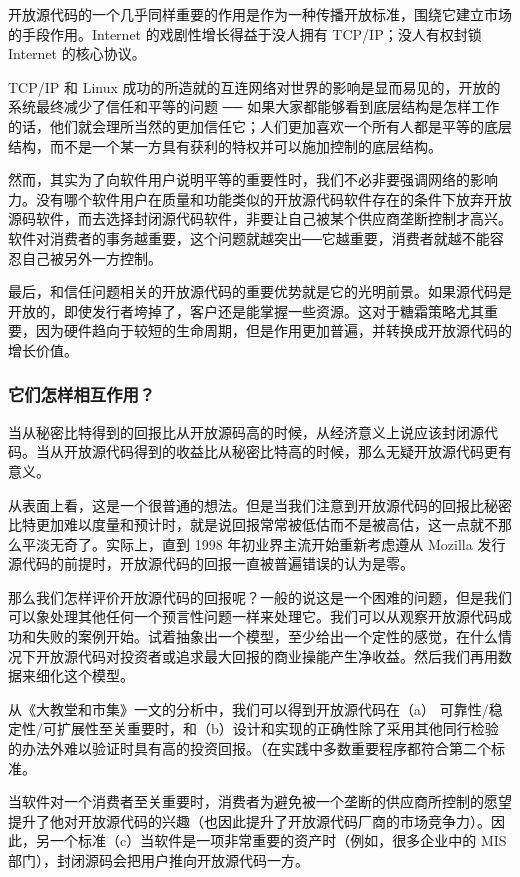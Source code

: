 开放源代码的一个几乎同样重要的作用是作为一种传播开放标准，围绕它建立市场的手段作用。Internet 的戏剧性增长得益于没人拥有 TCP/IP；没人有权封锁 Internet 的核心协议。


TCP/IP 和 Linux 成功的所造就的互连网络对世界的影响是显而易见的，开放的系统最终减少了信任和平等的问题 ── 如果大家都能够看到底层结构是怎样工作的话，他们就会理所当然的更加信任它；人们更加喜欢一个所有人都是平等的底层结构，而不是一个某一方具有获利的特权并可以施加控制的底层结构。


然而，其实为了向软件用户说明平等的重要性时，我们不必非要强调网络的影响力。没有哪个软件用户在质量和功能类似的开放源代码软件存在的条件下放弃开放源码软件，而去选择封闭源代码软件，非要让自己被某个供应商垄断控制才高兴。软件对消费者的事务越重要，这个问题就越突出──它越重要，消费者就越不能容忍自己被另外一方控制。


最后，和信任问题相关的开放源代码的重要优势就是它的光明前景。如果源代码是开放的，即使发行者垮掉了，客户还是能掌握一些资源。这对于糖霜策略尤其重要，因为硬件趋向于较短的生命周期，但是作用更加普遍，并转换成开放源代码的增长价值。

\subsubsection{它们怎样相互作用？}
当从秘密比特得到的回报比从开放源码高的时候，从经济意义上说应该封闭源代码。当从开放源代码得到的收益比从秘密比特高的时候，那么无疑开放源代码更有意义。


从表面上看，这是一个很普通的想法。但是当我们注意到开放源代码的回报比秘密比特更加难以度量和预计时，就是说回报常常被低估而不是被高估，这一点就不那么平淡无奇了。实际上，直到 1998 年初业界主流开始重新考虑遵从 Mozilla 发行源代码的前提时，开放源代码的回报一直被普遍错误的认为是零。


那么我们怎样评价开放源代码的回报呢？一般的说这是一个困难的问题，但是我们可以象处理其他任何一个预言性问题一样来处理它。我们可以从观察开放源代码成功和失败的案例开始。试着抽象出一个模型，至少给出一个定性的感觉，在什么情况下开放源代码对投资者或追求最大回报的商业操能产生净收益。然后我们再用数据来细化这个模型。


从《大教堂和市集》一文的分析中，我们可以得到开放源代码在（a） 可靠性/稳定性/可扩展性至关重要时，和（b）设计和实现的正确性除了采用其他同行检验的办法外难以验证时具有高的投资回报。（在实践中多数重要程序都符合第二个标准。


当软件对一个消费者至关重要时，消费者为避免被一个垄断的供应商所控制的愿望提升了他对开放源代码的兴趣（也因此提升了开放源代码厂商的市场竞争力）。因此，另一个标准（c）当软件是一项非常重要的资产时（例如，很多企业中的 MIS 部门），封闭源码会把用户推向开放源代码一方。


